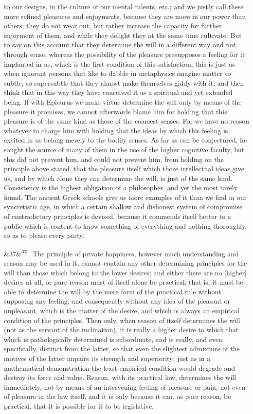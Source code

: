 \documentclass[12pt]{article}
\newcommand{\para}[1][]{\par\noindent\ifx&#1&\else\textsuperscript{\footnotesize #1}~\fi}
\begin{document}
to our designs, in the culture of our mental talents, etc.; and we justly call these more refined pleasures and enjoyments, because they are more in our power than others; they do not wear out, but rather increase the capacity for further enjoyment of them, and while they delight they at the same time cultivate. But to say on this account that they determine the will in a different way and not through sense, whereas the possibility of the pleasure presupposes a feeling for it implanted in us, which is the first condition of this satisfaction; this is just as when ignorant persons that like to dabble in metaphysics imagine matter so subtle, so supersubtle that they almost make themselves giddy with it, and then think that in this way they have conceived it as a spiritual and yet extended being. If with Epicurus we make virtue determine the will only by means of the pleasure it promises, we cannot afterwards blame him for holding that this pleasure is of the same kind as those of the coarsest senses. For we have no reason whatever to charge him with holding that the ideas by which this feeling is excited in us belong merely to the bodily senses. As far as can be conjectured, he sought the source of many of them in the use of the higher cognitive faculty, but this did not prevent him, and could not prevent him, from holding on the principle above stated, that the pleasure itself which those intellectual ideas give us, and by which alone they can determine the will, is just of the same kind. Consistency is the highest obligation of a philosopher, and yet the most rarely found. The ancient Greek schools give us more examples of it than we find in our syncretistic age, in which a certain shallow and dishonest system of compromise of contradictory principles is devised, because it commends itself better to a public which is content to know something of everything and nothing thoroughly, so as to please every party.

\para[37] The principle of private happiness, however much understanding and reason may be used in it, cannot contain any other determining principles for the will than those which belong to the lower desires; and either there are no [higher] desires at all, or pure reason must of itself alone be practical; that is, it must be able to determine the will by the mere form of the practical rule without supposing any feeling, and consequently without any idea of the pleasant or unpleasant, which is the matter of the desire, and which is always an empirical condition of the principles. Then only, when reason of itself determines the will (not as the servant of the inclination), it is really a higher desire to which that which is pathologically determined is subordinate, and is really, and even specifically, distinct from the latter, so that even the slightest admixture of the motives of the latter impairs its strength and superiority; just as in a mathematical demonstration the least empirical condition would degrade and destroy its force and value. Reason, with its practical law, determines the will immediately, not by means of an intervening feeling of pleasure or pain, not even of pleasure in the law itself, and it is only because it can, as pure reason, be practical, that it is possible for it to be legislative.
\end{document}
